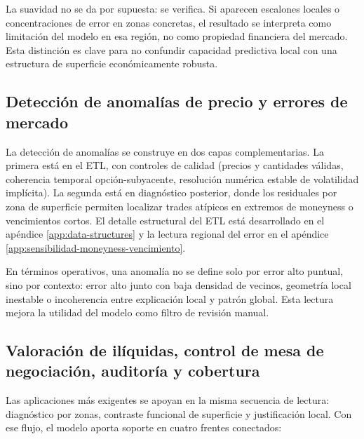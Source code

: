 La suavidad no se da por supuesta: se verifica. Si aparecen escalones locales o concentraciones de error en zonas concretas, el resultado se interpreta como limitación del modelo en esa región, no como propiedad financiera del mercado. Esta distinción es clave para no confundir capacidad predictiva local con una estructura de superficie económicamente robusta.

\subsection{Detección de anomalías de precio y errores de mercado}
\label{subsec:anomalias-precio-mercado}

La detección de anomalías se construye en dos capas complementarias. La primera está en el ETL, con controles de calidad (precios y cantidades válidas, coherencia temporal opción-subyacente, resolución numérica estable de volatilidad implícita). La segunda está en diagnóstico posterior, donde los residuales por zona de superficie permiten localizar trades atípicos en extremos de moneyness o vencimientos cortos. El detalle estructural del ETL está desarrollado en el apéndice \ref{app:data-structures} y la lectura regional del error en el apéndice \ref{app:sensibilidad-moneyness-vencimiento}.

En términos operativos, una anomalía no se define solo por error alto puntual, sino por contexto: error alto junto con baja densidad de vecinos, geometría local inestable o incoherencia entre explicación local y patrón global. Esta lectura mejora la utilidad del modelo como filtro de revisión manual.

\subsection{Valoración de ilíquidas, control de mesa de negociación, auditoría y cobertura}
\label{subsec:uso-operativo-derivados}

Las aplicaciones más exigentes se apoyan en la misma secuencia de lectura: diagnóstico por zonas, contraste funcional de superficie y justificación local. Con ese flujo, el modelo aporta soporte en cuatro frentes conectados:

